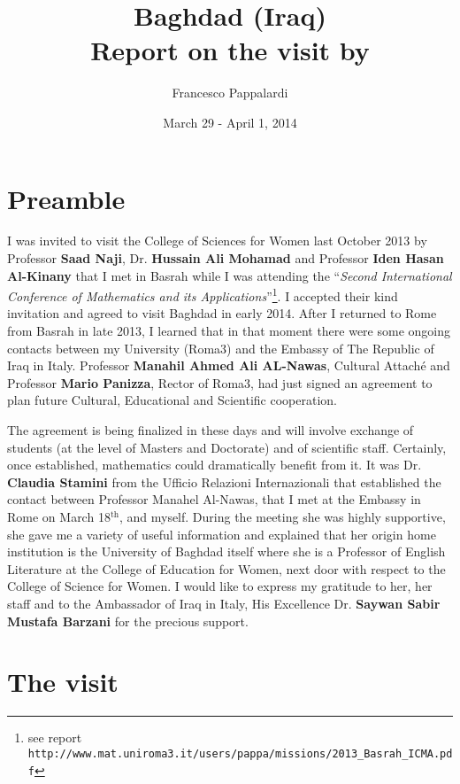 \documentclass[12pt,a4paper]{scrartcl}
\title{Baghdad (Iraq)\\ Report on the visit by}
\author{Francesco Pappalardi}
\date{March 29 - April 1, 2014}
\begin{document}
\maketitle


\section{Preamble}

I was invited to visit the College of Sciences for Women last October 2013 by 
Professor \textbf{Saad Naji}, Dr. \textbf{Hussain Ali Mohamad} and 
Professor \textbf{Iden Hasan Al-Kinany} that I met in Basrah
while I was attending the ``\textsl{Second International Conference 
of Mathematics and its Applications}''\footnote{see report \texttt{http://www.mat.uniroma3.it/users/pappa/missions/2013\_Basrah\_ICMA.pdf}}. 
 I accepted their kind invitation and agreed to visit Baghdad in early 2014. After I returned to 
Rome from Basrah in late 2013, I learned  that in that moment there were some ongoing contacts between my University (Roma3) and the 
Embassy of The Republic of Iraq in Italy. Professor \textbf{Manahil Ahmed Ali AL-Nawas}, Cultural Attach\'e and Professor \textbf{Mario Panizza}, Rector of
Roma3,
had just signed an agreement to plan future Cultural, Educational and Scientific cooperation.  

The agreement is being finalized in these days and will involve exchange of students (at the level of Masters and Doctorate) and of scientific staff.  
Certainly, once established, mathematics could dramatically benefit from it. 
It was Dr. \textbf{Claudia Stamini}
from the Ufficio Relazioni Internazionali that established the contact between Professor Manahel Al-Nawas, that I met at the Embassy
in Rome on March 18$^{\textrm{th}}$, and myself. During the meeting she was highly supportive, she gave me a variety of useful information and explained that her
origin home institution is the University of Baghdad itself where she is a Professor of English Literature at the College of Education for Women, next door with respect
to the College of Science for Women. I would like to express my gratitude to her, her staff and to the Ambassador of Iraq in Italy, His
Excellence Dr. \textbf{Saywan Sabir Mustafa Barzani} for the 
precious support.

\section{The visit}
\end{document}
